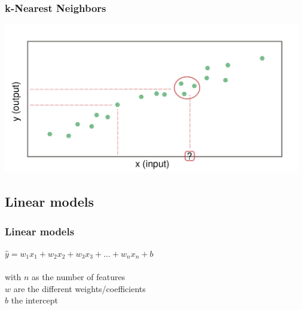 \documentclass[aspectratio=169]{beamer}
\begin{document}
\begin{frame}
  \frametitle{k-Nearest Neighbors}
  \begin{center}
    \includegraphics[width=13.0cm]{images/k_nearest_neighbour_regression_k_3.pdf}
  \end{center}
\end{frame}


\subsection{Linear models}





\begin{frame}
  \frametitle{Linear models}
  \begin{block}{}
    \begin{center}
      $\hat{y} = w_{1}x_{1} + w_{2}x_{2} + w_{3}x_{3} + ... + w_{n}x_{n} + b$\\
      \ \\
      with $n$ as the  number of features\\
      $w$ are the different weights/coefficients\\
      $b$ the intercept\\
    \end{center}
  \end{block}  
\end{frame}
\end{document}
